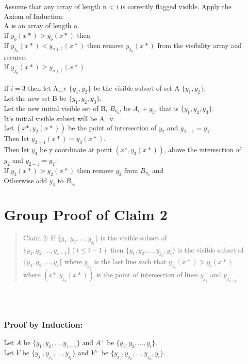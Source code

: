 \documentclass{article}
\begin{document}
Assume that any array of length n < i is correctly flagged visible.
Apply the Axiom of Induction:\\
A is an array of length o.\\

If $y_o (x*) > y_o (x*)$ then \\
If $y_{j_n}(x*) < y_{o + 1} (x*)$ then remove $y_{j_n}(x*)$ from the visibility array and recurse.\\
If $y_{j_n}(x*) \geq y_{o + 1} (x*)$\\
\\
If $i = 3$ then let A_v $\{y_1, y_2\}$ be the visible subset of set A $\{y_1, y_2\}$.\\
Let the new set B be $\{y_1, y_2, y_3\}$.\\
Let the new initial visible set of B, $B_{v_{0}}$, be $A_v + y_3$, that is $\{y_1, y_2, y_3\}$.\\
It's initial visible subset will be A_v.\\
Let $(x*, y_2 (x*))$ be the point of intersection of $y_2$ and $y_{2 - 1} = y_1$.\\
Then let $y_{2 + 1} (x*) = y_3 (x*)$.\\
Then let $y_3$ be y coordinate at point $(x*, y_3 (x*))$, above the intersection of $y_2$ and $y_{2 - 1} = y_1$.\\
If $y_3 (x*) > y_2 (x*)$ then remove $y_2$ from $B_{v_0}$ and \\
Otherwise add $y_3$ to $B_{v_0}$\\


\section*{Group Proof of Claim 2}
\begin{quote}
    Claim 2: If $\{y_1, y_2,...,y_{j_{t}}\}$ is the visible subset of $\{y_1, y_2,...,y_{i - 1}\} (t \leq i - 1)$ then $\{y_1, y_2,...,y_{j_{k}}, y_i\}$ is the visible subset of $\{y_1, y_2,...,y_{i}\}$ where $y_{j_{k}}$ is the last line such that $y_{j_{k}} (x*) > y_i (x*)$ where $(x*, y_{j_{k}}(x*))$ is the point of intersection of lines $y_{j_{k}}$ and $y_{j_{k - 1}}$.
\end{quote}\\
\\
\subsubsection*{Proof by Induction:}
Let $A$ be $\{y_{1}, y_2, ..., y_{i - 1}\}$ and $A^+$ be $\{y_1, y_2, ..., y_{i}\}$.\\
Let $V$ be $\{y_{j_1}, y_{j_2}, ..., y_{j_t}\}$ and $V^+$ be $\{y_{j_1}, y_{j_2}, ..., y_{j_k}, y_{i}\}$.\\
\end{document}
